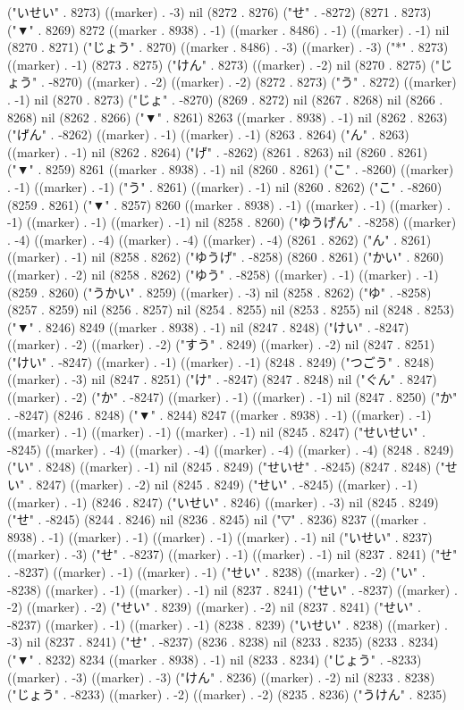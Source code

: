 ("いせい" . 8273) ((marker) . -3) nil (8272 . 8276) ("せ" . -8272) (8271 . 8273) ("▼" . 8269) 8272 ((marker . 8938) . -1) ((marker . 8486) . -1) ((marker) . -1) nil (8270 . 8271) ("じょう" . 8270) ((marker . 8486) . -3) ((marker) . -3) ("*" . 8273) ((marker) . -1) (8273 . 8275) ("けん" . 8273) ((marker) . -2) nil (8270 . 8275) ("じょう" . -8270) ((marker) . -2) ((marker) . -2) (8272 . 8273) ("う" . 8272) ((marker) . -1) nil (8270 . 8273) ("じょ" . -8270) (8269 . 8272) nil (8267 . 8268) nil (8266 . 8268) nil (8262 . 8266) ("▼" . 8261) 8263 ((marker . 8938) . -1) nil (8262 . 8263) ("げん" . -8262) ((marker) . -1) ((marker) . -1) (8263 . 8264) ("ん" . 8263) ((marker) . -1) nil (8262 . 8264) ("げ" . -8262) (8261 . 8263) nil (8260 . 8261) ("▼" . 8259) 8261 ((marker . 8938) . -1) nil (8260 . 8261) ("こ" . -8260) ((marker) . -1) ((marker) . -1) ("う" . 8261) ((marker) . -1) nil (8260 . 8262) ("こ" . -8260) (8259 . 8261) ("▼" . 8257) 8260 ((marker . 8938) . -1) ((marker) . -1) ((marker) . -1) ((marker) . -1) ((marker) . -1) nil (8258 . 8260) ("ゆうげん" . -8258) ((marker) . -4) ((marker) . -4) ((marker) . -4) ((marker) . -4) (8261 . 8262) ("ん" . 8261) ((marker) . -1) nil (8258 . 8262) ("ゆうげ" . -8258) (8260 . 8261) ("かい" . 8260) ((marker) . -2) nil (8258 . 8262) ("ゆう" . -8258) ((marker) . -1) ((marker) . -1) (8259 . 8260) ("うかい" . 8259) ((marker) . -3) nil (8258 . 8262) ("ゆ" . -8258) (8257 . 8259) nil (8256 . 8257) nil (8254 . 8255) nil (8253 . 8255) nil (8248 . 8253) ("▼" . 8246) 8249 ((marker . 8938) . -1) nil (8247 . 8248) ("けい" . -8247) ((marker) . -2) ((marker) . -2) ("すう" . 8249) ((marker) . -2) nil (8247 . 8251) ("けい" . -8247) ((marker) . -1) ((marker) . -1) (8248 . 8249) ("つごう" . 8248) ((marker) . -3) nil (8247 . 8251) ("け" . -8247) (8247 . 8248) nil ("ぐん" . 8247) ((marker) . -2) ("か" . -8247) ((marker) . -1) ((marker) . -1) nil (8247 . 8250) ("か" . -8247) (8246 . 8248) ("▼" . 8244) 8247 ((marker . 8938) . -1) ((marker) . -1) ((marker) . -1) ((marker) . -1) ((marker) . -1) nil (8245 . 8247) ("せいせい" . -8245) ((marker) . -4) ((marker) . -4) ((marker) . -4) ((marker) . -4) (8248 . 8249) ("い" . 8248) ((marker) . -1) nil (8245 . 8249) ("せいせ" . -8245) (8247 . 8248) ("せい" . 8247) ((marker) . -2) nil (8245 . 8249) ("せい" . -8245) ((marker) . -1) ((marker) . -1) (8246 . 8247) ("いせい" . 8246) ((marker) . -3) nil (8245 . 8249) ("せ" . -8245) (8244 . 8246) nil (8236 . 8245) nil ("▽" . 8236) 8237 ((marker . 8938) . -1) ((marker) . -1) ((marker) . -1) ((marker) . -1) nil ("いせい" . 8237) ((marker) . -3) ("せ" . -8237) ((marker) . -1) ((marker) . -1) nil (8237 . 8241) ("せ" . -8237) ((marker) . -1) ((marker) . -1) ("せい" . 8238) ((marker) . -2) ("い" . -8238) ((marker) . -1) ((marker) . -1) nil (8237 . 8241) ("せい" . -8237) ((marker) . -2) ((marker) . -2) ("せい" . 8239) ((marker) . -2) nil (8237 . 8241) ("せい" . -8237) ((marker) . -1) ((marker) . -1) (8238 . 8239) ("いせい" . 8238) ((marker) . -3) nil (8237 . 8241) ("せ" . -8237) (8236 . 8238) nil (8233 . 8235) (8233 . 8234) ("▼" . 8232) 8234 ((marker . 8938) . -1) nil (8233 . 8234) ("じょう" . -8233) ((marker) . -3) ((marker) . -3) ("けん" . 8236) ((marker) . -2) nil (8233 . 8238) ("じょう" . -8233) ((marker) . -2) ((marker) . -2) (8235 . 8236) ("うけん" . 8235) 